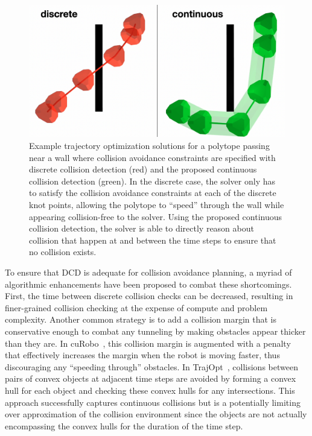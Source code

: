 \begin{figure}[t!]
\centering 
\includegraphics[width=.8\linewidth]{figures/thru_wall/thru_wall_3.png}
\caption{
Example trajectory optimization solutions for a polytope passing near a wall where collision avoidance constraints are specified with discrete collision detection (red) and the proposed continuous collision detection (green). In the discrete case, the solver only has to satisfy the collision avoidance constraints at each of the discrete knot points, allowing the polytope to ``speed'' through the wall while appearing collision-free to the solver. Using the proposed continuous collision detection, the solver is able to directly reason about collision that happen at and between the time steps to ensure that no collision exists.
}
\label{fig:thru_wall}
\end{figure}

To ensure that DCD is adequate for collision avoidance planning, a myriad of algorithmic enhancements have been proposed to combat these shortcomings. First, the time between discrete collision checks can be decreased, resulting in finer-grained collision checking at the expense of compute and problem complexity. Another common strategy is to add a collision margin that is conservative enough to combat any tunneling by making obstacles appear thicker than they are. In cuRobo~\cite{sundaralingam2023}, this collision margin is augmented with a penalty that effectively increases the margin when the robot is moving faster, thus discouraging any ``speeding through'' obstacles. In TrajOpt~\cite{schulman2013a}, collisions between pairs of convex objects at adjacent time steps are avoided by forming a convex hull for each object and checking these convex hulls for any intersections. This approach successfully captures continuous collisions but is a potentially limiting over approximation of the collision environment since the objects are not actually encompassing the convex hulls for the duration of the time step. 

